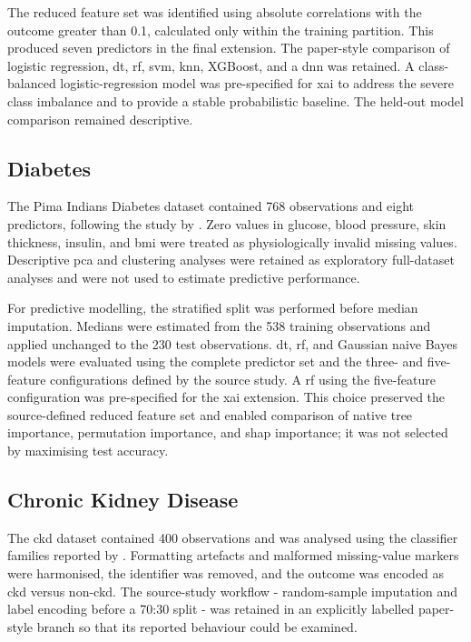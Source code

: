 The reduced feature set was identified using absolute correlations with the outcome greater than 0.1, calculated only within the training partition. This produced seven predictors in the final extension. The paper-style comparison of logistic regression, \gls{dt}, \gls{rf}, \gls{svm}, \gls{knn}, XGBoost, and a \gls{dnn} was retained. A class-balanced logistic-regression model was pre-specified for \gls{xai} to address the severe class imbalance and to provide a stable probabilistic baseline. The held-out model comparison remained descriptive.

\subsection{Diabetes}

The Pima Indians Diabetes dataset contained 768 observations and eight predictors, following the study by \citet{chang_pima_2023}. Zero values in glucose, blood pressure, skin thickness, insulin, and \gls{bmi} were treated as physiologically invalid missing values. Descriptive \gls{pca} and clustering analyses were retained as exploratory full-dataset analyses and were not used to estimate predictive performance.

For predictive modelling, the stratified split was performed before median imputation. Medians were estimated from the 538 training observations and applied unchanged to the 230 test observations. \Gls{dt}, \gls{rf}, and Gaussian naive Bayes models were evaluated using the complete predictor set and the three- and five-feature configurations defined by the source study. A \gls{rf} using the five-feature configuration was pre-specified for the \gls{xai} extension. This choice preserved the source-defined reduced feature set and enabled comparison of native tree importance, permutation importance, and \gls{shap} importance; it was not selected by maximising test accuracy.

\subsection{Chronic Kidney Disease}

The \gls{ckd} dataset contained 400 observations and was analysed using the classifier families reported by \citet{santhiya_chronic_2024}. Formatting artefacts and malformed missing-value markers were harmonised, the identifier was removed, and the outcome was encoded as \gls{ckd} versus non-\gls{ckd}. The source-study workflow - random-sample imputation and label encoding before a 70:30 split - was retained in an explicitly labelled paper-style branch so that its reported behaviour could be examined.

